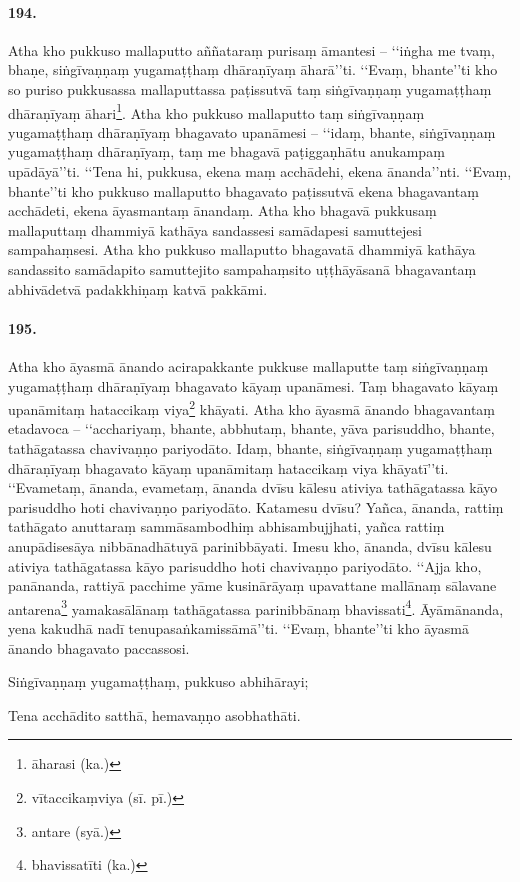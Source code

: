 \paragraph{194.} Atha kho pukkuso mallaputto aññataraṃ purisaṃ āmantesi – ‘‘iṅgha me tvaṃ, bhaṇe, siṅgīvaṇṇaṃ yugamaṭṭhaṃ dhāraṇīyaṃ āharā’’ti. ‘‘Evaṃ, bhante’’ti kho so puriso pukkusassa mallaputtassa paṭissutvā taṃ siṅgīvaṇṇaṃ yugamaṭṭhaṃ dhāraṇīyaṃ āhari\footnote{āharasi (ka.)}. Atha kho pukkuso mallaputto taṃ siṅgīvaṇṇaṃ yugamaṭṭhaṃ dhāraṇīyaṃ bhagavato upanāmesi – ‘‘idaṃ, bhante, siṅgīvaṇṇaṃ yugamaṭṭhaṃ dhāraṇīyaṃ, taṃ me bhagavā paṭiggaṇhātu anukampaṃ upādāyā’’ti. ‘‘Tena hi, pukkusa, ekena maṃ acchādehi, ekena ānanda’’nti. ‘‘Evaṃ, bhante’’ti kho pukkuso mallaputto bhagavato paṭissutvā ekena bhagavantaṃ acchādeti, ekena āyasmantaṃ ānandaṃ. Atha kho bhagavā pukkusaṃ mallaputtaṃ dhammiyā kathāya sandassesi samādapesi samuttejesi sampahaṃsesi. Atha kho pukkuso mallaputto bhagavatā dhammiyā kathāya sandassito samādapito samuttejito sampahaṃsito uṭṭhāyāsanā bhagavantaṃ abhivādetvā padakkhiṇaṃ katvā pakkāmi.

\paragraph{195.} Atha kho āyasmā ānando acirapakkante pukkuse mallaputte taṃ siṅgīvaṇṇaṃ yugamaṭṭhaṃ dhāraṇīyaṃ bhagavato kāyaṃ upanāmesi. Taṃ bhagavato kāyaṃ upanāmitaṃ hataccikaṃ viya\footnote{vītaccikaṃviya (sī. pī.)} khāyati. Atha kho āyasmā ānando bhagavantaṃ etadavoca – ‘‘acchariyaṃ, bhante, abbhutaṃ, bhante, yāva parisuddho, bhante, tathāgatassa chavivaṇṇo pariyodāto. Idaṃ, bhante, siṅgīvaṇṇaṃ yugamaṭṭhaṃ dhāraṇīyaṃ bhagavato kāyaṃ upanāmitaṃ hataccikaṃ viya khāyatī’’ti. ‘‘Evametaṃ, ānanda, evametaṃ, ānanda dvīsu kālesu ativiya tathāgatassa kāyo parisuddho hoti chavivaṇṇo pariyodāto. Katamesu dvīsu? Yañca, ānanda, rattiṃ tathāgato anuttaraṃ sammāsambodhiṃ abhisambujjhati, yañca rattiṃ anupādisesāya nibbānadhātuyā parinibbāyati. Imesu kho, ānanda, dvīsu kālesu ativiya tathāgatassa kāyo parisuddho hoti chavivaṇṇo pariyodāto. ‘‘Ajja kho, panānanda, rattiyā pacchime yāme kusinārāyaṃ upavattane mallānaṃ sālavane antarena\footnote{antare (syā.)} yamakasālānaṃ tathāgatassa parinibbānaṃ bhavissati\footnote{bhavissatīti (ka.)}. Āyāmānanda, yena kakudhā nadī tenupasaṅkamissāmā’’ti. ‘‘Evaṃ, bhante’’ti kho āyasmā ānando bhagavato paccassosi.

Siṅgīvaṇṇaṃ yugamaṭṭhaṃ, pukkuso abhihārayi;

Tena acchādito satthā, hemavaṇṇo asobhathāti.

